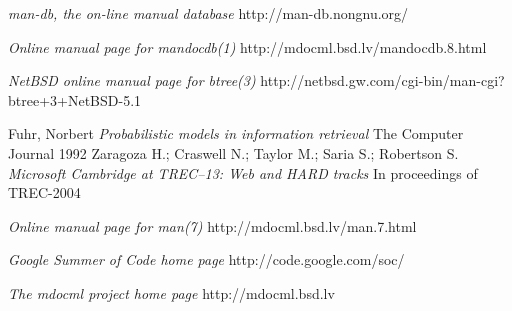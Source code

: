 \documentclass[titlepage, a4paper, 12pt]{article}
\begin{document}
\begin{thebibliography}{20}
\emph{man-db, the on-line manual database}
\newline http://man-db.nongnu.org/

\emph{Online manual page for mandocdb(1)}
\newline http://mdocml.bsd.lv/mandocdb.8.html

\emph{NetBSD online manual page for btree(3)}
\newline http://netbsd.gw.com/cgi-bin/man-cgi?btree+3+NetBSD-5.1

Fuhr, Norbert
\emph{Probabilistic models in information
retrieval}
The Computer Journal
1992
Zaragoza H.; Craswell N.; Taylor M.;
Saria S.; Robertson S.
\emph{Microsoft Cambridge at TREC–13: Web
and HARD tracks}
In proceedings of TREC-2004

\emph{Online manual page for man(7)}
\newline http://mdocml.bsd.lv/man.7.html

\emph{Google Summer of Code home page}
\newline http://code.google.com/soc/

\emph {The mdocml project home page}
\newline http://mdocml.bsd.lv
\end{thebibliography}
\end{document}
